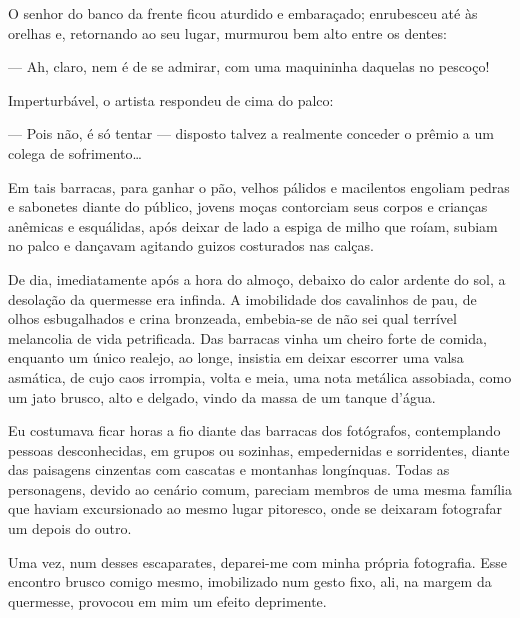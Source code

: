 O senhor do banco da frente ficou aturdido e embaraçado; enrubesceu até às
orelhas e, retornando ao seu lugar, murmurou bem alto entre os dentes: 

--- Ah, claro, nem é de se admirar, com uma maquininha daquelas no pescoço!

Imperturbável, o artista respondeu de cima do palco:

--- Pois não, é só tentar --- disposto talvez a realmente conceder o prêmio a
    um colega de sofrimento\ldots{}

Em tais barracas, para ganhar o pão, velhos pálidos e macilentos engoliam
pedras e sabonetes diante do público, jovens moças contorciam seus corpos e
crianças anêmicas e esquálidas, após deixar de lado a espiga de milho que
roíam, subiam no palco e dançavam agitando guizos costurados nas calças.

De dia, imediatamente após a hora do almoço, debaixo do calor ardente do sol,
a desolação da quermesse era infinda. A imobilidade dos cavalinhos de pau, de
olhos esbugalhados e crina bronzeada, embebia-se de não sei qual terrível
melancolia de vida petrificada. Das barracas vinha um cheiro forte de comida,
enquanto um único realejo, ao longe, insistia em deixar escorrer uma valsa
asmática, de cujo caos irrompia, volta e meia, uma nota metálica assobiada,
como um jato brusco, alto e delgado, vindo da massa de um tanque d'água.

Eu costumava ficar horas a fio diante das barracas dos fotógrafos,
contemplando pessoas desconhecidas, em grupos ou sozinhas, empedernidas e
sorridentes, diante das paisagens cinzentas com cascatas e montanhas
longínquas. Todas as personagens, devido ao cenário comum, pareciam membros
de uma mesma família que haviam excursionado ao mesmo lugar pitoresco, onde
se deixaram fotografar um depois do outro.

Uma vez, num desses escaparates, deparei-me com minha própria fotografia. Esse
encontro brusco comigo mesmo, imobilizado num gesto fixo, ali, na margem da
quermesse, provocou em mim um efeito deprimente.

